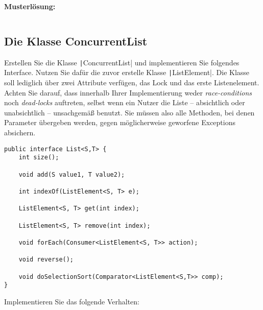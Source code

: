 \documentclass[11pt]{exam} %
\newcommand{\code}[1]{\texttt|#1|}
\begin{document}
\ifprintanswers
\textbf{Musterlösung:}\par\nobreak
\inputminted[linenos,breaklines,breakindent=20pt,frame=single,tabsize=4]{Java}{../src/ListElement.java}
\fi

\subsection{Die Klasse ConcurrentList}
Erstellen Sie die Klasse \code{ConcurrentList} und implementieren Sie folgendes Interface. Nutzen Sie dafür die zuvor erstelle Klasse \code{ListElement}. Die Klasse soll lediglich über zwei Attribute verfügen, das Lock und das erste Listenelement. Achten Sie darauf, dass innerhalb Ihrer Implementierung weder \emph{race-conditions} noch \emph{dead-locks} auftreten, selbst wenn ein Nutzer die Liste \linebreak[2] – absichtlich oder unabsichtlich – unsachgemäß benutzt. Sie müssen also alle Methoden, bei denen Parameter übergeben werden, gegen möglicherweise geworfene Exceptions absichern.
\begin{verbatim}
public interface List<S,T> {
	int size();
	
	void add(S value1, T value2);
	
	int indexOf(ListElement<S, T> e);
	
	ListElement<S, T> get(int index); 
	
	ListElement<S, T> remove(int index);
	
	void forEach(Consumer<ListElement<S, T>> action);

	void reverse();
	
	void doSelectionSort(Comparator<ListElement<S,T>> comp);
}
\end{verbatim}
Implementieren Sie das folgende Verhalten:
\end{document}

